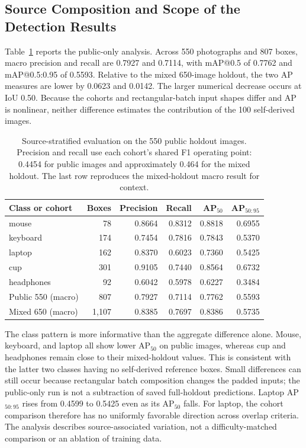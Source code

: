 \documentclass[12pt,a4paper]{article}
\makeatletter
\newcommand{\mAPfifty}{mAP@0.5}
\newcommand{\mAPcoco}{mAP@0.5:0.95}
\makeatother
\begin{document}
\subsection{Source Composition and Scope of the Detection Results}

Table~\ref{tab:publicsubset} reports the public-only analysis. Across 550 photographs and 807 boxes, macro precision and recall are 0.7927 and 0.7114, with \mAPfifty{} of 0.7762 and \mAPcoco{} of 0.5593. Relative to the mixed 650-image holdout, the two AP measures are lower by 0.0623 and 0.0142. The larger numerical decrease occurs at IoU 0.50. Because the cohorts and rectangular-batch input shapes differ and AP is nonlinear, neither difference estimates the contribution of the 100 self-derived images.

\begin{table}[htbp]
\caption{Source-stratified evaluation on the 550 public holdout images. Precision and recall use each cohort's shared F1 operating point: 0.4454 for public images and approximately 0.464 for the mixed holdout. The last row reproduces the mixed-holdout macro result for context.}
\label{tab:publicsubset}
\centering
\small
\begin{tabular}{lrrrrr}
\toprule
Class or cohort & Boxes & Precision & Recall & AP$_{50}$ & AP$_{50:95}$ \\
\midrule
mouse & 78 & 0.8664 & 0.8312 & 0.8818 & 0.6955 \\
keyboard & 174 & 0.7454 & 0.7816 & 0.7843 & 0.5370 \\
laptop & 162 & 0.8370 & 0.6023 & 0.7360 & 0.5425 \\
cup & 301 & 0.9105 & 0.7440 & 0.8564 & 0.6732 \\
headphones & 92 & 0.6042 & 0.5978 & 0.6227 & 0.3484 \\
\midrule
Public 550 (macro) & 807 & 0.7927 & 0.7114 & 0.7762 & 0.5593 \\
Mixed 650 (macro) & 1,107 & 0.8385 & 0.7697 & 0.8386 & 0.5735 \\
\bottomrule
\end{tabular}
\end{table}

The class pattern is more informative than the aggregate difference alone. Mouse, keyboard, and laptop all show lower AP$_{50}$ on public images, whereas cup and headphones remain close to their mixed-holdout values. This is consistent with the latter two classes having no self-derived reference boxes. Small differences can still occur because rectangular batch composition changes the padded inputs; the public-only run is not a subtraction of saved full-holdout predictions. Laptop AP$_{50:95}$ rises from 0.4599 to 0.5425 even as its AP$_{50}$ falls. For laptop, the cohort comparison therefore has no uniformly favorable direction across overlap criteria. The analysis describes source-associated variation, not a difficulty-matched comparison or an ablation of training data.
\end{document}
